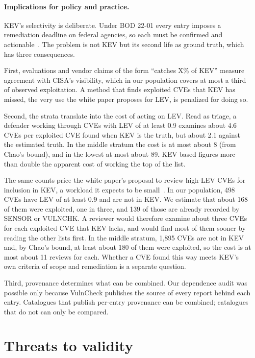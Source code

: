 \paragraph{Implications for policy and practice.} KEV's selectivity is
deliberate. Under BOD 22-01 every entry imposes a remediation deadline on
federal agencies, so each must be confirmed and actionable~\cite{cisa2022kev}.
The problem is not KEV but its second life as ground truth, which has three
consequences.

First, evaluations and vendor claims of the form ``catches X\% of KEV''
measure agreement with CISA's visibility, which in our population covers at most
a third of observed exploitation. A method that finds exploited CVEs that KEV
has missed, the very use the white paper proposes for LEV, is penalized for
doing so.

Second, the strata translate into the cost of acting on LEV. Read as triage, a
defender working through CVEs with LEV of at least 0.9 examines about 4.6 CVEs
per exploited CVE found when KEV is the truth, but about 2.1 against the
estimated truth. In the middle stratum the cost is at most about 8 (from Chao's
bound), and in the lowest at most about 89. KEV-based figures more than double
the apparent cost of working the top of the list.

The same counts price the white paper's proposal to review high-LEV CVEs for
inclusion in KEV, a workload it expects to be
small~\cite[Sec.~3.3]{mell2025lev}. In our population, 498 CVEs have LEV of at
least 0.9 and are not in KEV. We estimate that about 168 of them were
exploited, one in three, and 139 of those are already recorded by SENSOR or
VULNCHK. A reviewer would therefore examine about three CVEs for each exploited
CVE that KEV lacks, and would find most of them sooner by reading the other
lists first. In the middle stratum, 1,895 CVEs are not in KEV and, by Chao's
bound, at least about 180 of them were exploited, so the cost is at most about
11 reviews for each. Whether a CVE found this way meets KEV's own criteria of
scope and remediation is a separate question.

Third, provenance determines what can be combined. Our dependence audit was
possible only because VulnCheck publishes the source of every report behind
each entry. Catalogues that publish per-entry provenance can be combined;
catalogues that do not can only be compared.

\section{Threats to validity}\label{sec:threats}

